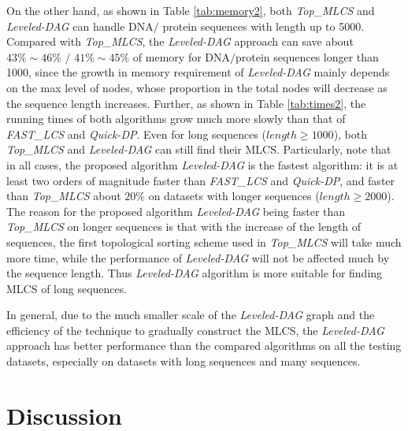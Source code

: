 \documentclass[utf8]{frontiersSCNS} %
\begin{document}
On the other hand, as shown in Table \ref{tab:memory2}, both
\emph{Top\_MLCS} and \emph{Leveled-DAG} can handle DNA$/$ protein
sequences with length up to 5000. Compared with \emph{Top\_MLCS}, the
\emph{Leveled-DAG} approach can save about $43\% \sim 46\%$ $/$
$41\% \sim 45\%$ of memory for DNA$/$protein sequences longer than
1000, since the growth in memory requirement of \emph{Leveled-DAG}
mainly depends on the max level of nodes, whose proportion in the
total nodes will decrease as the sequence length increases. Further,
as shown in Table \ref{tab:times2}, the running times of both
algorithms grow much more slowly than that of \emph{FAST\_LCS} and
\emph{Quick-DP}. Even for long sequences ($length \geq 1000$), both
\emph{Top\_MLCS} and \emph{Leveled-DAG} can still find their
MLCS. Particularly, note that in all cases, the proposed algorithm
\emph{Leveled-DAG} is the fastest algorithm: it is at least two orders
of magnitude faster than \emph{FAST\_LCS} and \emph{Quick-DP}, and
faster than \emph{Top\_MLCS} about $20\%$ on datasets with longer
sequences ($length \geq 2000$). The reason for the proposed algorithm
\emph{Leveled-DAG} being faster than \emph{Top\_MLCS} on longer
sequences is that with the increase of the length of sequences, the
first topological sorting scheme used in \emph{Top\_MLCS} will take
much more time, while the performance of \emph{Leveled-DAG} will not
be affected much by the sequence length. Thus \emph{Leveled-DAG}
algorithm is more suitable for finding MLCS of long sequences.

In general, due to the much smaller scale of the \emph{Leveled-DAG}
graph and the efficiency of the technique to gradually construct the
MLCS, the \emph{Leveled-DAG} approach has better performance than the
compared algorithms on all the testing datasets, especially on
datasets with long sequences and many sequences.


\section{Discussion}
\end{document}
